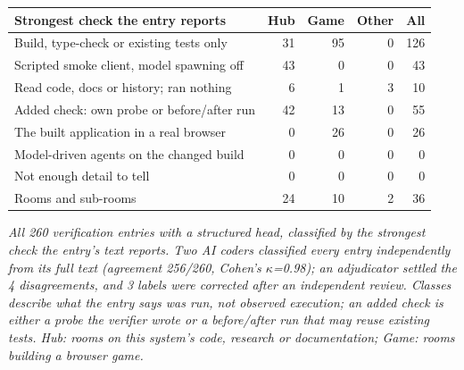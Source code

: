 \begin{tabular}{lrrrr}
\toprule
Strongest check the entry reports & Hub & Game & Other & All \\
\midrule
Build, type-check or existing tests only & 31 & 95 & 0 & 126 \\
Scripted smoke client, model spawning off & 43 & 0 & 0 & 43 \\
Read code, docs or history; ran nothing & 6 & 1 & 3 & 10 \\
Added check: own probe or before/after run & 42 & 13 & 0 & 55 \\
The built application in a real browser & 0 & 26 & 0 & 26 \\
Model-driven agents on the changed build & 0 & 0 & 0 & 0 \\
Not enough detail to tell & 0 & 0 & 0 & 0 \\
\midrule
Rooms and sub-rooms & 24 & 10 & 2 & 36 \\
\bottomrule
\end{tabular}

\emph{All 260 verification entries with a structured head, classified by the strongest check the entry's text reports. Two AI coders classified every entry independently from its full text (agreement 256/260, Cohen's \(\kappa\)=0.98); an adjudicator settled the 4 disagreements, and 3 labels were corrected after an independent review. Classes describe what the entry says was run, not observed execution; an added check is either a probe the verifier wrote or a before/after run that may reuse existing tests. Hub: rooms on this system's code, research or documentation; Game: rooms building a browser game.}
